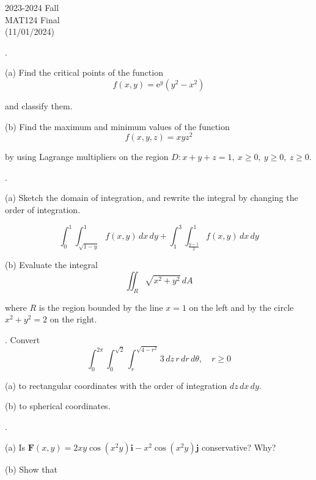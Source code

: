 \documentclass{article}
\begin{document}
\pagestyle{empty}
\large

\begin{center}
2023-2024 Fall \\MAT124 Final\\(11/01/2024)
\end{center}

.

\hfill

\noindent (a) Find the critical points of the function
\[f(x,y)=\mathrm{e}^y\left(y^2-x^2\right)\]

\noindent and classify them.

\hfill

\noindent (b) Find the maximum and minimum values of the function
\[f(x,y,z)=xyz^2\]

\noindent by using Lagrange multipliers on the region $D:x+y+z=1,\:x\geq0,\:y\geq0,\:z\geq0$.

\hfill

.

\hfill

\noindent (a) Sketch the domain of integration, and rewrite the integral by changing the order of integration.

\[\int_0^1\int_{\sqrt{1-y}}^1f(x,y)\,dx\,dy+\int_1^3\int_{\textstyle\frac{y-1}2}^1f(x,y)\,dx\,dy\]

\hfill

\noindent (b) Evaluate the integral
\[\iint_R\sqrt{x^2+y^2}\,dA\]

\noindent where $R$ is the region bounded by the line $x=1$ on the left and by the circle $x^2+y^2=2$ on the right.

\hfill

. Convert
\[\int_0^{2\pi}\int_0^{\sqrt2}\int_r^{\sqrt{4-r^2}}3\,dz\,r\,dr\,d\theta,\quad r\geq0\]

\hfill

\noindent (a) to rectangular coordinates with the order of integration $dz\,dx\,dy$.

\hfill

\noindent (b) to spherical coordinates.

\hfill

.

\hfill

\noindent (a) Is $\mathbf{F}(x,y)=2xy\cos\left(x^2y\right)\mathbf{i}-x^2\cos\left(x^2y\right)\mathbf{j}$ conservative? Why?

\hfill

\noindent (b) Show that
\end{document}
